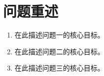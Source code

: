 \section{问题重述}


\begin{enumerate}[label=问题 \arabic*：,leftmargin=*]
  \item 在此描述问题一的核心目标。
  \item 在此描述问题二的核心目标。
  \item 在此描述问题三的核心目标。
\end{enumerate}
